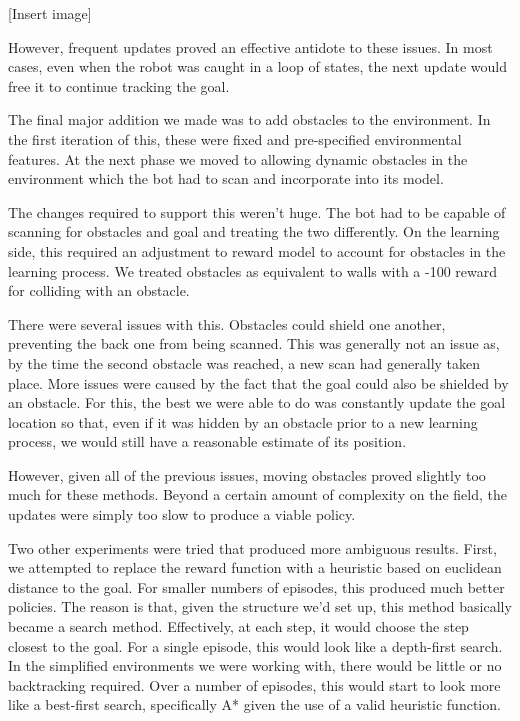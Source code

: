 \documentclass{aiaa-tc}%
\begin{document}
[Insert image]

However, frequent updates proved an effective antidote to these
issues. In most cases, even when the robot was caught in a loop of
states, the next update would free it to continue tracking the goal.

The final major addition we made was to add obstacles to the
environment. In the first iteration of this, these were fixed and
pre-specified environmental features. At the next phase we moved to
allowing dynamic obstacles in the environment which the bot had to
scan and incorporate into its model.

The changes required to support this weren't huge. The bot had to be
capable of scanning for obstacles and goal and treating the two
differently. On the learning side, this required an adjustment to
reward model to account for obstacles in the learning
process. We treated obstacles as equivalent to walls with a -100
reward for colliding with an obstacle.

There were several issues with this. Obstacles could shield one
another, preventing the back one from being scanned. This was
generally not an issue as, by the time the second obstacle was
reached, a new scan had generally taken place. More issues were caused
by the fact that the goal could also be shielded by an
obstacle. For this, the best we were able to do was constantly update
the goal location so that, even if it was hidden by an obstacle prior
to a new learning process, we would still have a reasonable estimate
of its position.

However, given all of the previous issues, moving obstacles proved
slightly too much for these methods. Beyond a certain amount of
complexity on the field, the updates were simply too slow to produce a
viable policy.

Two other experiments were tried that produced more ambiguous
results. First, we attempted to replace the reward function with a
heuristic based on euclidean distance to the goal. For smaller numbers
of episodes, this produced much better policies. The reason is that,
given the structure we'd set up, this method basically became a
search method. Effectively, at each step, it
would choose the step closest to the goal. For a single episode,
this would look like a depth-first search. In the simplified
environments we were working with, there would be little or no
backtracking required. Over a number of episodes, this would start to
look more like a best-first search, specifically A* given the use of a
valid heuristic function.
\end{document}
